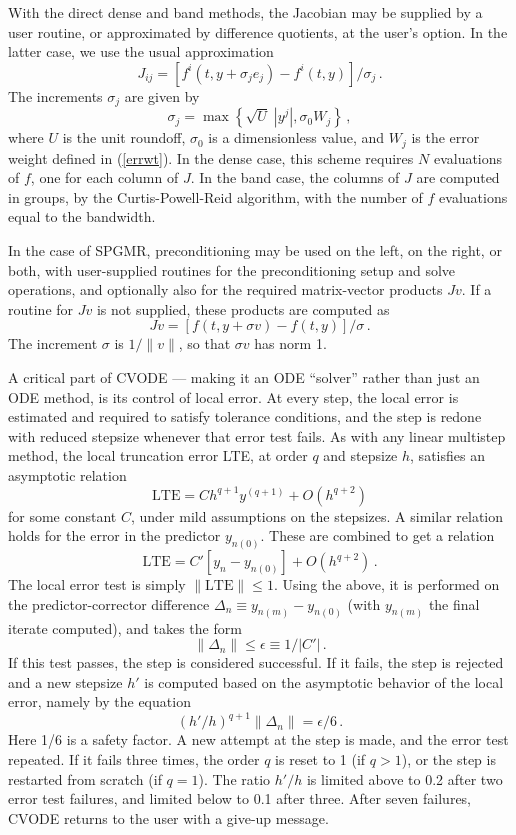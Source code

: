 With the direct dense and band methods, the Jacobian may be supplied
by a user routine, or approximated by difference quotients,
at the user's option.  In the latter case, we use the usual
approximation
\[ J_{ij} = [f^i(t,y+\sigma_j e_j) - f^i(t,y)]/\sigma_j \, . \]
The increments $\sigma_j$ are given by
\[ \sigma_j = \max\left\{\sqrt{U} \; |y^j| , \sigma_0 W_j \right\} \, , \]
where $U$ is the unit roundoff, $\sigma_0$ is a dimensionless value,
and $W_j$ is the error weight defined in (\ref{errwt}).  In the dense
case, this scheme requires $N$ evaluations of $f$, one for each column
of $J$.  In the band case, the columns of $J$ are computed in groups,
by the Curtis-Powell-Reid algorithm, with the number of $f$ evaluations
equal to the bandwidth.

In the case of SPGMR, preconditioning may be used on the left, on the
right, or both, with user-supplied routines for the preconditioning
setup and solve operations, and optionally also for the required
matrix-vector products $Jv$.  If a routine for $Jv$ is not supplied,
these products are computed as
\begin{equation}\label{jacobv}
Jv = [f(t,y+\sigma v) - f(t,y)]/\sigma \, . 
\end{equation}
The increment $\sigma$ is $1/\|v\|$, so that $\sigma v$ has norm 1.

A critical part of CVODE --- making it an ODE ``solver'' rather than
just an ODE method, is its control of local error.  At every step, the
local error is estimated and required to satisfy tolerance conditions,
and the step is redone with reduced stepsize whenever that error test
fails.  As with any linear multistep method, the local truncation
error LTE, at order $q$ and stepsize $h$, satisfies an asymptotic
relation
\[ \mbox{LTE} = C h^{q+1} y^{(q+1)} + O(h^{q+2}) \]
for some constant $C$, under mild assumptions on the stepsizes.
A similar relation holds for the error in the predictor $y_{n(0)}$.
These are combined to get a relation
\[ \mbox{LTE} = C' [y_n - y_{n(0)}] + O(h^{q+2}) \, . \]
The local error test is simply $\|\mbox{LTE}\| \leq 1$.  Using the above,
it is performed on the predictor-corrector difference 
$\Delta_n \equiv y_{n(m)} - y_{n(0)}$ (with $y_{n(m)}$ the final
iterate computed), and takes the form
\[ \|\Delta_n\| \leq \epsilon \equiv 1/|C'| \, . \]
If this test passes, the step is considered successful.  If it fails,
the step is rejected and a new stepsize $h'$ is computed based on the
asymptotic behavior of the local error, namely by the equation
\[ (h'/h)^{q+1} \|\Delta_n\| = \epsilon/6 \, . \]
Here 1/6 is a safety factor.  A new attempt at the step is made,
and the error test repeated.  If it fails three times, the order $q$
is reset to 1 (if $q > 1$), or the step is restarted from scratch (if
$q = 1$).  The ratio $h'/h$ is limited above to 0.2 after two error test
failures, and limited below to 0.1 after three.  After seven failures,
CVODE returns to the user with a give-up message.

